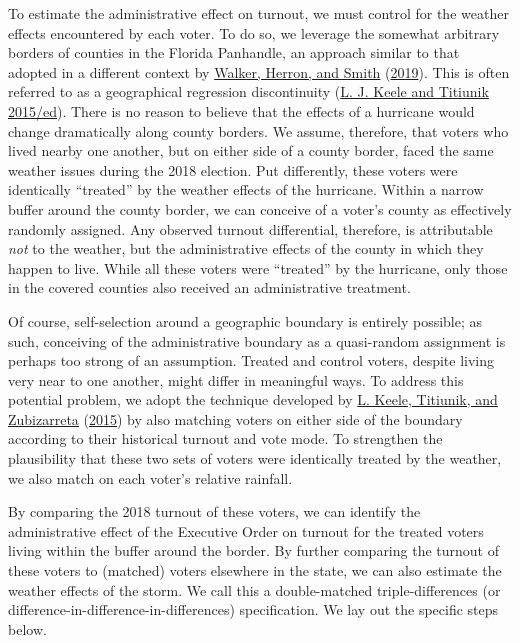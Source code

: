 \documentclass[
  12pt,
]{article}
\begin{document}
To estimate the administrative effect on turnout, we must control for the weather effects encountered by each voter. To do so, we leverage the somewhat arbitrary borders of counties in the Florida Panhandle, an approach similar to that adopted in a different context by \protect\hyperlink{ref-Walker2019}{Walker, Herron, and Smith} (\protect\hyperlink{ref-Walker2019}{2019}). This is often referred to as a geographical regression discontinuity (\protect\hyperlink{ref-Keele2015}{L. J. Keele and Titiunik 2015/ed}). There is no reason to believe that the effects of a hurricane would change dramatically along county borders. We assume, therefore, that voters who lived nearby one another, but on either side of a county border, faced the same weather issues during the 2018 election. Put differently, these voters were identically ``treated'' by the weather effects of the hurricane. Within a narrow buffer around the county border, we can conceive of a voter's county as effectively randomly assigned. Any observed turnout differential, therefore, is attributable \emph{not} to the weather, but the administrative effects of the county in which they happen to live. While all these voters were ``treated'' by the hurricane, only those in the covered counties also received an administrative treatment.

Of course, self-selection around a geographic boundary is entirely possible; as such, conceiving of the administrative boundary as a quasi-random assignment is perhaps too strong of an assumption. Treated and control voters, despite living very near to one another, might differ in meaningful ways. To address this potential problem, we adopt the technique developed by \protect\hyperlink{ref-Keele2015a}{L. Keele, Titiunik, and Zubizarreta} (\protect\hyperlink{ref-Keele2015a}{2015}) by also matching voters on either side of the boundary according to their historical turnout and vote mode. To strengthen the plausibility that these two sets of voters were identically treated by the weather, we also match on each voter's relative rainfall.

By comparing the 2018 turnout of these voters, we can identify the administrative effect of the Executive Order on turnout for the treated voters living within the buffer around the border. By further comparing the turnout of these voters to (matched) voters elsewhere in the state, we can also estimate the weather effects of the storm. We call this a double-matched triple-differences (or difference-in-difference-in-differences) specification. We lay out the specific steps below.
\end{document}
